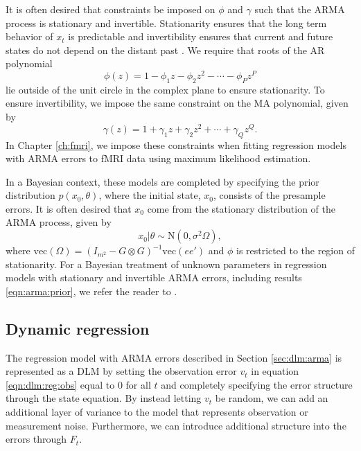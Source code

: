 It is often desired that constraints be imposed on $\phi$ and $\gamma$ such that the ARMA process is stationary and invertible. Stationarity ensures that the long term behavior of $x_t$ is predictable and invertibility ensures that current and future states do not depend on the distant past \citep{shum:stof:2006:timeseries}. We require that roots of the AR polynomial
\begin{equation}
\phi(z) = 1 - \phi_1z - \phi_2z^2 - \cdots - \phi_Pz^P \label{eqn:arpoly}
\end{equation}
lie outside of the unit circle in the complex plane to ensure stationarity. To ensure invertibility, we impose the same constraint on the MA polynomial, given by
\begin{equation}
\gamma(z) = 1 + \gamma_1z + \gamma_2z^2 + \cdots + \gamma_Qz^Q. \label{eqn:mapoly}
\end{equation}
In Chapter \ref{ch:fmri}, we impose these constraints when fitting regression models with ARMA errors to fMRI data using maximum likelihood estimation.

In a Bayesian context, these models are completed by specifying the prior distribution $p(x_0, \theta)$, where the initial state, $x_0$, consists of the presample errors. It is often desired that $x_0$ come from the stationary distribution of the ARMA process, given by
\begin{equation}
x_0|\theta \sim \mbox{N}(0, \sigma^2\Omega), \label{eqn:arma:prior}
\end{equation}
where $\mbox{vec}(\Omega) = (I_{m^2} - G\otimes G)^{-1} \mbox{vec}(ee')$ and $\phi$ is restricted to the region of stationarity. For a Bayesian treatment of unknown parameters in regression models with stationary and invertible ARMA errors, including results \eqref{eqn:arma:prior}, we refer the reader to \citet{chib:greenberg:1994:arma}.

\subsection{Dynamic regression \label{sec:dlm:arwn}}

The regression model with ARMA errors described in Section \ref{sec:dlm:arma} is represented as a DLM by setting the observation error $v_t$ in equation \eqref{eqn:dlm:reg:obs} equal to 0 for all $t$ and completely specifying the error structure through the state equation. By instead letting $v_t$ be random, we can add an additional layer of variance to the model that represents observation or measurement noise. Furthermore, we can introduce additional structure into the errors through $F_t$.

